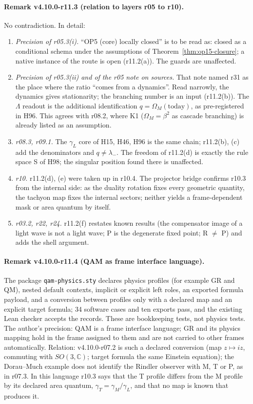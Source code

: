 \paragraph{Remark v4.10.0-r11.3 (relation to layers r05 to r10).}
No contradiction.  In detail:
\begin{enumerate}[leftmargin=2em]
\item[(a)] \emph{Precision of r05.3(i).}  ``OP5 (core) locally closed'' is to be read as: closed as a conditional schema under the assumptions of
Theorem~\ref{thm:op15-closure}; a native instance of the route is open (r11.2(a)).  The guards are unaffected.
\item[(b)] \emph{Precision of r05.3(ii) and of the r05 note on sources.}  That note named r31 as the place where the ratio ``comes from a dynamics''.
Read narrowly, the dynamics gives stationarity; the branching number is an input (r11.2(b)).  The \(\Lambda\) readout is the additional identification
\(q=\Omega_M(\text{today})\), as pre-registered in H96.  This agrees with r08.2, where K1 (\(\Omega_M=\beta^2\) as cascade branching) is already listed as an
assumption.
\item[(c)] \emph{r08.3, r09.1.}  The \(\gamma_L\) core of H15, H46, H96 is the same chain; r11.2(b), (c) add the denominators and \(q\neq\lambda_-\).  The
freedom of r11.2(d) is exactly the rule space S of H98; the singular position found there is unaffected.
\item[(d)] \emph{r10.}  r11.2(d), (e) were taken up in r10.4.  The projector bridge confirms r10.3 from the internal side: as the duality rotation fixes
every geometric quantity, the tachyon map fixes the internal sectors; neither yields a frame-dependent mask or area quantum by itself.
\item[(e)] \emph{r03.2, r22, r24.}  r11.2(f) restates known results (the compensator image of a light wave is not a light wave; P is the degenerate fixed
point; R \(\neq\) P) and adds the shell argument.
\end{enumerate}

\paragraph{Remark v4.10.0-r11.4 (QAM as frame interface language).}
The package \texttt{qam-physics.sty} declares physics profiles (for example GR and QM), nested default contexts, implicit or explicit left roles, an exported
formula payload, and a conversion between profiles only with a declared map and an explicit target formula; 34 software cases and ten exports pass,
and the existing Lean checker accepts the records.  These are bookkeeping tests, not physics tests.  The author's precision: QAM is a frame interface
language; GR and its physics mapping hold in the frame assigned to them and are not carried to other frames automatically.  Relation: v4.10.0-r07.2 is
such a declared conversion (map \(z\mapsto iz\), commuting with \(SO(3,\mathbb C)\); target formula the same Einstein equation); the Dorau--Much example
does not identify the Rindler observer with M, T or P, as in r07.3.  In this language r10.3 says that the T profile differs from the M profile by its
declared area quantum, \(\gamma_T=\gamma_M/\gamma_L\), and that no map is known that produces it.

